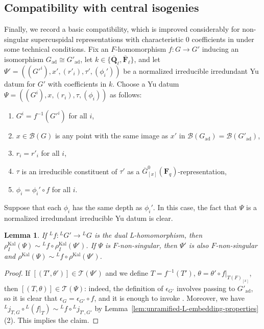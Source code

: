 \documentclass[reqno]{amsart}
\numberwithin{equation}{subsection}
\newcommand{\F}{\mathbf{F}}
\newcommand{\Q}{\mathbf{Q}}
\newcommand{\ol}[1]{\overline{#1}}
\newcommand{\co}{\colon}
\newcommand{\ld}{{}^L}
\newcommand\cB{\mathcal{B}}
\newcommand\cT{\mathcal{T}}
\DeclareMathOperator{\ad}{ad}
\DeclareMathOperator{\Kal}{Kal}
\newtheorem{lemma}[thm]{Lemma}
\theoremstyle{remark}
\numberwithin{equation}{subsection}
\numberwithin{figure}{subsection}
\begin{document}
\subsection{Compatibility with central isogenies}

Finally, we record a basic compatibility, which is improved considerably for non-singular supercuspidal representations with characteristic $0$ coefficients in \cite{BM25} under some technical conditions. Fix an $F$-homomorphism $f\co G \to G'$ inducing an isomorphism $G_{\ad} \cong G'_{\ad}$, let $k \in \{\ol\Q_\ell, \ol\F_\ell\}$, and let $\Psi' = ((G'^i), x', (r'_i), \tau', (\phi_i'))$ be a normalized irreducible irredundant Yu datum for $G'$ with coefficients in $k$. Choose a Yu datum $\Psi = ((G^i), x, (r_i), \tau, (\phi_i))$ as follows:
\begin{enumerate}
\item $G^i = f^{-1}(G'^i)$ for all $i$,
\item $x \in \cB(G)$ is any point with the same image as $x'$ in $\cB(G_{\ad}) = \cB(G'_{\ad})$,
\item $r_i = r'_i$ for all $i$,
\item $\tau$ is an irreducible constituent of $\tau'$ as a $\ol G^0_{[x]}(\F_q)$-representation,
\item $\phi_i = \phi_i' \circ f$ for all $i$.
\end{enumerate}
Suppose that each $\phi_i$ has the same depth as $\phi_i'$. In this case, the fact that $\Psi$ is a normalized irredundant irreducible Yu datum is clear.

\begin{lemma}\label{lemma:kaletha-compatibility-with-central-isogenies}
If $\ld f\co \ld G' \to \ld G$ is the dual L-homomorphism, then $\rho_I^{\Kal}(\Psi) \sim \ld f \circ \rho_I^{\Kal}(\Psi')$. If $\Psi$ is $F$-non-singular, then $\Psi'$ is also $F$-non-singular and $\rho^{\Kal}(\Psi) \sim \ld f \circ \rho^{\Kal}(\Psi')$.
\end{lemma}

\begin{proof}
If $[(T', \theta')] \in \cT(\Psi')$ and we define $T = f^{-1}(T')$, $\theta = \theta' \circ f|_{T(F)_{[x]}}$, then $[(T, \theta)] \in \cT(\Psi)$: indeed, the definition of $\epsilon_{G'}$ involves passing to $G'_{\ad}$, so it is clear that $\epsilon_G = \epsilon_{G'} \circ f$, and it is enough to invoke \cite[Lemma~2.10.3]{Cot26b}. Moreover, we have $\ld j_{T,G} \circ \ld(f|_T) \sim \ld f\circ \ld j_{T',G'}$ by Lemma~\ref{lem:unramified-L-embedding-properties}(2). This implies the claim.
\end{proof}
\end{document}
